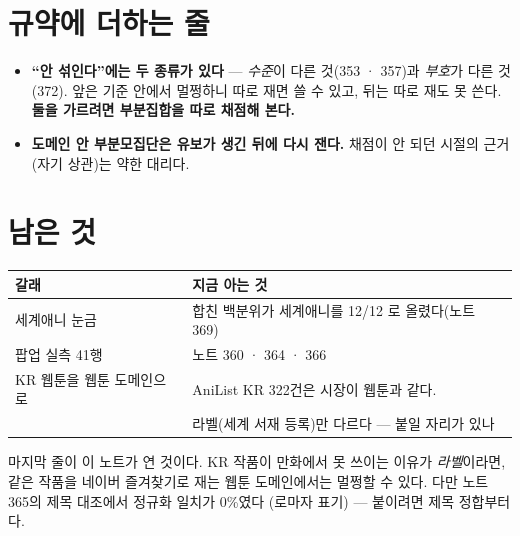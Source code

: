 \documentclass[11pt]{article}
\begin{document}
\section{규약에 더하는 줄}

\begin{itemize}
\item \textbf{``안 섞인다''에는 두 종류가 있다} --- \emph{수준}이 다른
것(353 · 357)과 \emph{부호}가 다른 것(372). 앞은 기준 안에서 멀쩡하니
따로 재면 쓸 수 있고, 뒤는 따로 재도 못 쓴다. \textbf{둘을 가르려면
부분집합을 따로 채점해 본다.}
\item \textbf{도메인 안 부분모집단은 유보가 생긴 뒤에 다시 잰다.} 채점이
안 되던 시절의 근거(자기 상관)는 약한 대리다.
\end{itemize}

\section{남은 것}

\begin{center}
\begin{tabular}{ll}
\hline
갈래 & 지금 아는 것 \\
\hline
세계애니 눈금 & 합친 백분위가 세계애니를 12/12 로 올렸다(노트 369) \\
팝업 실측 41행 & 노트 360 · 364 · 366 \\
KR 웹툰을 웹툰 도메인으로 & AniList KR 322건은 시장이 웹툰과 같다. \\
 & 라벨(세계 서재 등록)만 다르다 --- 붙일 자리가 있나 \\
\hline
\end{tabular}
\end{center}

마지막 줄이 이 노트가 연 것이다. KR 작품이 만화에서 못 쓰이는 이유가
\emph{라벨}이라면, 같은 작품을 네이버 즐겨찾기로 재는 웹툰 도메인에서는
멀쩡할 수 있다. 다만 노트 365의 제목 대조에서 정규화 일치가 0\%였다
(로마자 표기) --- 붙이려면 제목 정합부터다.
\end{document}
